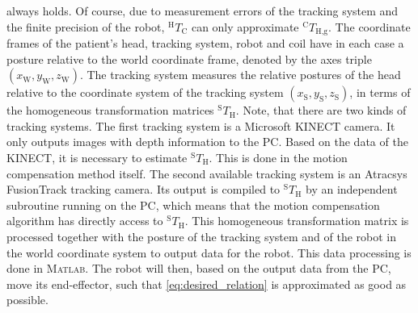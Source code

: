 always holds. Of course, due to measurement errors of the tracking system and the finite precision of the robot, $^{\text{H}}T_{\text{C}}$ can only approximate $^{\text{C}}T_{\text{H,g}}$. The coordinate frames of the patient's head, tracking system, robot and coil
have in each case a posture relative to the world coordinate frame, denoted by the axes triple
$\left( x_{\text{W}},y_{\text{W}},z_{\text{W}} \right)$. The tracking system measures the relative postures of the head relative to the coordinate system of the tracking system $\left( x_{\text{S}},y_{\text{S}},z_{\text{S}} \right)$, in terms of the homogeneous transformation matrices $^{\text{S}}T_{\text{H}}$. Note, that there are two kinds of tracking systems. The first tracking system is a Microsoft KINECT camera. It only outputs images with depth information to the PC. Based on the data of the KINECT, it is necessary to estimate $^{\text{S}}T_{\text{H}}$. This is done in the motion compensation method itself. The second available tracking system is an Atracsys FusionTrack tracking camera. Its output is compiled to $^{\text{S}}T_{\text{H}}$ by an independent subroutine running on the PC, which means that the motion compensation algorithm has directly access to $^{\text{S}}T_{\text{H}}$. This homogeneous transformation matrix  is processed together with the posture of the tracking system and of the robot in the world coordinate system to output data for the robot. This data processing is done in \textsc{Matlab}. The robot will then, based on the output data from the PC, move its end-effector, such that \eqref{eq:desired_relation} is approximated as good as possible.